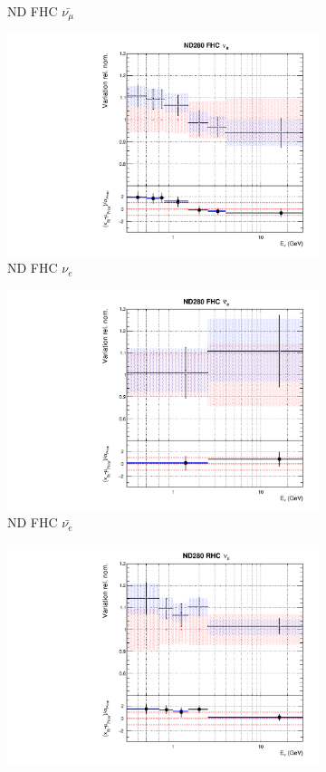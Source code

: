 \begin{figure}[!htbp]
\begin{subfigure}{0.45\textwidth}
  \caption{ND FHC $\bar{\nu_{\mu}}$}
\end{subfigure}
\begin{subfigure}{0.45\textwidth}
  \centering
  \includegraphics[width=0.75\linewidth]{figs/jointflux2}
  \caption{ND FHC $\nu_{e}$}
\end{subfigure}
\begin{subfigure}{0.45\textwidth}
  \centering
  \includegraphics[width=0.75\linewidth]{figs/jointflux3}
  \caption{ND FHC $\bar{\nu_{e}}$}
\end{subfigure}
\begin{subfigure}{0.45\textwidth}
  \centering
  \includegraphics[width=0.75\linewidth]{figs/jointflux4}

\end{subfigure}
\end{figure}
